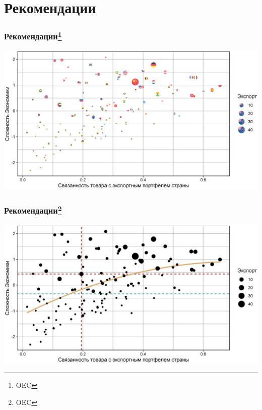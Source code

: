 \section{Рекомендации}

\begin{frame}
    \frametitle{Рекомендации\footnote{OEC}}
    \begin{center}
        \includegraphics[width=\textwidth, height=0.8\textheight]{Plots/Recommendation/oec-plot-2.eps}
    \end{center}
\end{frame}

\begin{frame}
    \frametitle{Рекомендации\footnote{OEC}}
    \begin{center}
        \includegraphics[width=\textwidth, height=0.8\textheight]{Plots/Recommendation/oec-plot-1.eps}
    \end{center}
\end{frame}